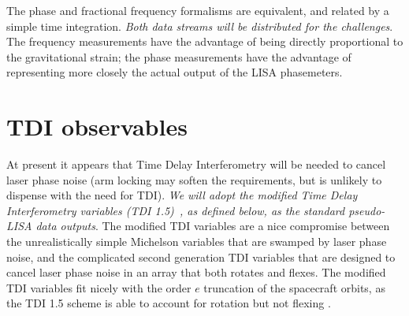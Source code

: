 \documentclass[11pt]{report}
\begin{document}
The phase and fractional frequency formalisms are equivalent, and related by a simple time integration.
{\em Both data streams will be distributed for the challenges}. The frequency measurements have the advantage of being directly proportional to the
gravitational strain; the phase measurements have the advantage of representing more closely the actual output
of the LISA phasemeters.  

\section{TDI observables}
\label{sec:tdi}

At present it appears that Time Delay Interferometry \cite{firstgen} will be needed to cancel laser phase
noise (arm locking may soften the requirements, but is unlikely to dispense with the need for TDI).
{\em We will adopt the modified Time Delay Interferometry variables (TDI 1.5)~\cite{secondgen,modified},
as defined below, as the standard pseudo-LISA data outputs}. The modified TDI variables are a nice compromise
between the unrealistically simple Michelson variables that are swamped by laser phase noise, and the complicated
second generation TDI variables
that are designed to cancel laser phase noise in an array that both rotates and flexes. The modified
TDI variables fit nicely with the order $e$ truncation of the spacecraft orbits, as the TDI 1.5 scheme is
able to account for rotation but not flexing \cite{modified}.
\end{document}
